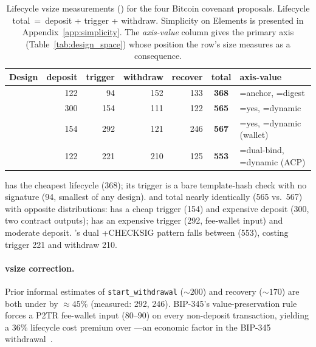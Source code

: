 \begin{table}[t]
\centering
\caption{Lifecycle vsize measurements (\vB{}) for the four
Bitcoin covenant proposals. Lifecycle total~=~deposit +
trigger + withdraw. Simplicity on Elements is presented in
Appendix~\ref{app:simplicity}. The \emph{axis-value} column gives
the primary axis (Table~\ref{tab:design_space}) whose position the
row's size measures as a consequence.}
\label{tab:vsizes}
\begin{tabular}{@{}lrrrrcl@{}}
\toprule
Design      & deposit & trigger & withdraw & recover & \textbf{total} & axis-value                                          \\
\midrule
\opctv{}    & 122     &  94     & 152      & 133     & \textbf{368}   & \axfee{}=anchor, \axwdbind{}=digest                 \\
\opccv{}    & 300     & 154     & 111      & 122     & \textbf{565}   & \axrevault{}=yes, \axfee{}=dynamic                  \\
\opvault{}  & 154     & 292     & 121      & 246     & \textbf{567}   & \axrevault{}=yes, \axfee{}=dynamic (wallet)         \\
\catcsfs{}  & 122     & 221     & 210      & 125     & \textbf{553}   & \axwdbind{}=dual-bind, \axfee{}=dynamic (ACP)       \\
\bottomrule
\end{tabular}
\end{table}

\opctv{} has the cheapest lifecycle (368\vB{}); its trigger is a bare
template-hash check with no signature (94\vB{}, smallest of any
design). \opccv{} and \opvault{} total nearly identically (565 vs.\
567\vB{}) with opposite distributions: \opccv{} has a cheap trigger
(154\vB{}) and expensive deposit (300\vB{}, two contract outputs);
\opvault{} has an expensive trigger (292\vB{}, fee-wallet input) and
moderate deposit. \catcsfs{}'s dual \opcsfs{}+CHECKSIG pattern falls
between (553\vB{}), costing trigger 221\vB{} and withdraw 210\vB{}.

\paragraph{\opvault{} vsize correction.}
Prior informal estimates of \opvault{} \texttt{start\_withdrawal}
(${\sim}200$\vB{}) and recovery (${\sim}170$\vB{}) are both under by
$\approx 45\%$ (measured: 292\vB{}, 246\vB{}). BIP-345's
value-preservation rule forces a P2TR fee-wallet input
($80$--$90$\vB{}) on every non-deposit transaction, yielding a 36\%
lifecycle cost premium over \opccv{}---an economic factor in the BIP-345
withdrawal~\cite{OB25}.

